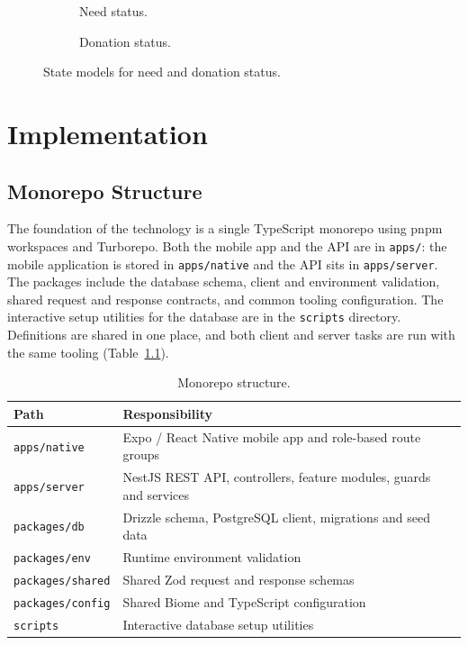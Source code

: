 \begin{figure}[H]
    \centering
    \begin{subfigure}[t]{0.48\textwidth}
        \centering
        \caption{Need status.}
    \end{subfigure}\hfill
    \begin{subfigure}[t]{0.48\textwidth}
        \centering
        \caption{Donation status.}
    \end{subfigure}
    \caption{State models for need and donation status.}
    \label{fig:states-b}
\end{figure}

\clearpage

\chapter{Implementation}
\label{ch:implementation}

\section{Monorepo Structure}
The foundation of the technology is a single TypeScript monorepo using pnpm workspaces and Turborepo. Both the mobile app and the API are in \texttt{apps/}: the mobile application is stored in \texttt{apps/native} and the API sits in \texttt{apps/server}. The packages include the database schema, client and environment validation, shared request and response contracts, and common tooling configuration. The interactive setup utilities for the database are in the \texttt{scripts} directory. Definitions are shared in one place, and both client and server tasks are run with the same tooling (Table~\ref{tab:monorepo}).

\begin{table}[H]\centering
\caption{Monorepo structure.}
\label{tab:monorepo}
\begin{tabularx}{\textwidth}{|p{}|X|}
\hline
\textbf{Path} & \textbf{Responsibility}\\\hline
\texttt{apps/native} & Expo / React Native mobile app and role-based route groups\\\hline
\texttt{apps/server} & NestJS REST API, controllers, feature modules, guards and services\\\hline
\texttt{packages/db} & Drizzle schema, PostgreSQL client, migrations and seed data\\\hline
\texttt{packages/env} & Runtime environment validation\\\hline
\texttt{packages/shared} & Shared Zod request and response schemas\\\hline
\texttt{packages/config} & Shared Biome and TypeScript configuration\\\hline
\texttt{scripts} & Interactive database setup utilities\\\hline
\end{tabularx}
\end{table}


